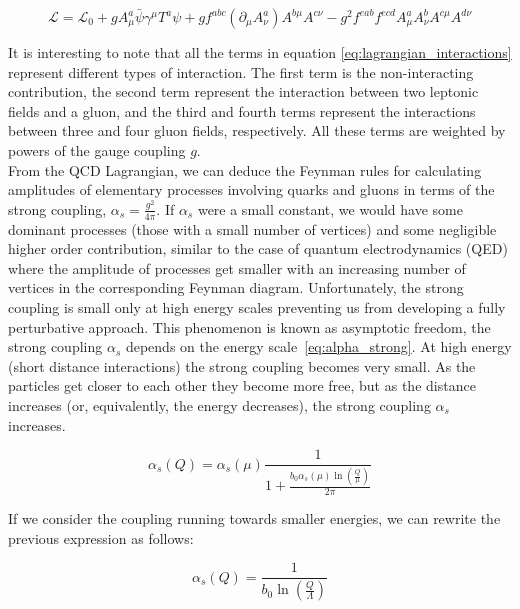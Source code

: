 \begin{equation}
\label{eq:lagrangian_interactions}
\mathcal{L} = \mathcal{L}_0 + g A_{\mu}^a \bar{\psi}\gamma^{\mu}T^a \psi + g f^{abc}(\partial_{\mu}A_{\nu}^a)A^{b\mu}A^{c\nu} - g^2  f^{eab}  f^{ecd} A_{\mu}^a A_{\nu}^b A^{c \mu} A^{d \nu}
\end{equation}

It is interesting to note that all the terms in equation \eqref{eq:lagrangian_interactions} represent different types of interaction. The first term is the non-interacting contribution, the second term represent the interaction between two leptonic fields and a gluon, and the third and fourth terms represent the interactions between three and four gluon fields, respectively. All these terms are weighted by powers of the gauge coupling $g$. \\

From the QCD Lagrangian, we can deduce the Feynman rules for calculating amplitudes of elementary processes involving quarks and gluons in terms of the strong coupling, $\alpha_s = \frac{g^2}{4\pi}$. If $\alpha_s$ were a small constant, we would have some dominant processes (those with a small number of vertices) and some negligible higher order contribution, similar to the case of quantum electrodynamics (QED) where the amplitude of processes get smaller with an increasing number of vertices in the corresponding Feynman diagram. Unfortunately, the strong coupling is small only at high energy scales preventing us from developing a fully perturbative approach. This phenomenon is known as asymptotic freedom, the strong coupling $\alpha_s$  depends on the energy scale~\eqref{eq:alpha_strong}. At high energy (short distance interactions) the strong coupling becomes very small. As the particles get closer to each other they become more free, but as the distance increases (or, equivalently, the energy decreases), the strong coupling $\alpha_s$ increases. 

\begin{equation}
\label{eq:alpha_strong}
\alpha_s(Q) = \alpha_s (\mu)\frac{1}{1+\frac{b_0  \alpha_s (\mu) \ln(\frac{Q}{\mu})}{2\pi}}
\end{equation}

If we consider the coupling running towards smaller energies, we can rewrite the previous expression as follows: 

\begin{equation}
\label{eq:alpha_strong2}
\alpha_s(Q) =\frac{1}{b_0  \ln(\frac{Q}{\Lambda})}
\end{equation}

